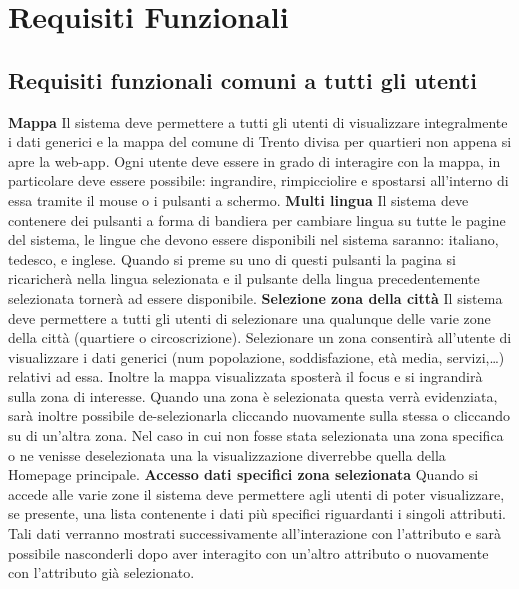\chapter{Requisiti Funzionali} 
    \section{Requisiti funzionali comuni a tutti gli utenti}
        \begin{rfList}
            \rfItem \textbf{Mappa} Il sistema deve permettere a tutti gli utenti di visualizzare integralmente i dati generici e la mappa del comune di Trento divisa per quartieri non appena si apre la web-app. Ogni utente deve essere in grado di interagire con la mappa, in particolare deve essere possibile: ingrandire, rimpicciolire e spostarsi all'interno di essa tramite il mouse o i pulsanti a schermo.
            \rfItem \textbf{Multi lingua} Il sistema deve contenere dei pulsanti a forma di bandiera per cambiare lingua su tutte le pagine del sistema, le lingue che devono essere disponibili nel sistema saranno: italiano, tedesco, e inglese. Quando si preme su uno di questi pulsanti la pagina si ricaricherà nella lingua selezionata e il pulsante della lingua precedentemente selezionata tornerà ad essere disponibile.
            \rfItem \textbf{Selezione zona della città} Il sistema deve permettere a tutti gli utenti di selezionare una qualunque delle varie zone della città (quartiere o circoscrizione). Selezionare un zona consentirà all'utente di visualizzare i dati generici (num popolazione, soddisfazione, età media, servizi,\dots) relativi ad essa. Inoltre la mappa visualizzata sposterà il focus e si ingrandirà sulla zona di interesse. Quando una zona è selezionata questa verrà evidenziata, sarà inoltre possibile de-selezionarla cliccando nuovamente sulla stessa o cliccando su di un'altra zona. Nel caso in cui non fosse stata selezionata una zona specifica o ne venisse deselezionata una la visualizzazione diverrebbe quella della Homepage principale.
            \rfItem \textbf{Accesso dati specifici zona selezionata} Quando si accede alle varie zone il sistema deve permettere agli utenti di poter visualizzare, se presente, una lista contenente i dati più specifici riguardanti i singoli attributi. Tali dati verranno mostrati successivamente all'interazione con l'attributo e sarà possibile nasconderli dopo aver interagito con un'altro attributo o nuovamente con l'attributo già selezionato.
        \end{rfList}
